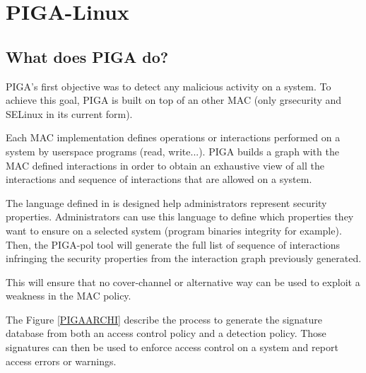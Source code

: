 \documentclass[pdftex,a4paper,titlepage,11pt]{article}
\begin{document}

\newpage

\section{PIGA-Linux}

\subsection{What does PIGA do?}

PIGA's first objective was to detect any malicious activity on a system. To
achieve this goal, PIGA is built on top of an other MAC (only grsecurity
and SELinux in its current form).

\bigskip

Each MAC implementation defines operations or interactions performed on a system
by userspace programs (read, write...). PIGA  builds a graph with the MAC
defined interactions in order to obtain an exhaustive view of all the
interactions and sequence of interactions that are allowed on a system.

\bigskip

The language defined in \cite{theseJBriffaut} is designed help administrators
represent security properties. Administrators can use this language to define
which properties they want to ensure on a selected system (program binaries
integrity for example). Then, the PIGA-pol tool will generate the full list of
sequence of interactions infringing the security properties from the interaction
graph previously generated.

\bigskip

This will ensure that no cover-channel or alternative way can be used to exploit
a weakness in the MAC policy.

\bigskip

The Figure \ref{PIGAARCHI} describe the process to generate the signature
database from both an access control policy and a detection policy. Those
signatures can then be used to enforce access control on a system and report
access errors or warnings.
\end{document}
